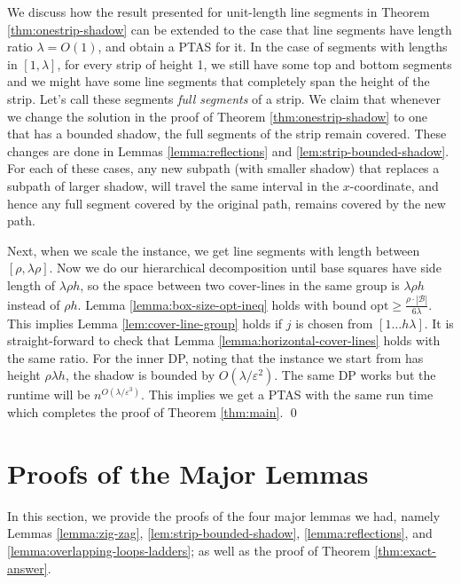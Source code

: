 \documentclass[pdflatex,sn-mathphys-num]{sn-jnl}
\theoremstyle{thmstyleone}
\newcommand{\eps}{\varepsilon}
\newcommand{\opt}{{\text{opt}}}
\begin{document}
	We discuss how the result presented for unit-length line segments in Theorem \ref{thm:onestrip-shadow} can be extended to the case that line segments have
	length ratio $\lambda=O(1)$, and obtain a PTAS for it.
	In the case of segments with lengths in $ [1, \lambda] $, for every strip of height 1, we still have some top and bottom segments and we might have some line segments
	that completely span the height of the strip. Let's call these segments {\em full segments} of a strip.
	We claim that whenever we change the solution in the proof of Theorem \ref{thm:onestrip-shadow} to one that has a bounded shadow, the full segments of the strip remain covered. These changes are done in Lemmas \ref{lemma:reflections} and \ref{lem:strip-bounded-shadow}. For each of these cases, any new subpath (with smaller shadow) that replaces a subpath of larger shadow, will travel the same interval in the $x$-coordinate, and hence any full segment covered by the original path, remains covered by the new path.
	
	Next, when we scale the instance, we get line segments with length between $[\rho,\lambda\rho]$.
	Now we do our hierarchical decomposition until base squares have side length of $\lambda\rho h$, so the space between
	two cover-lines in the same group is $\lambda \rho h$ instead of $\rho h$. 
	Lemma \ref{lemma:box-size-opt-ineq} holds with  bound $\opt\geq\frac{\rho\cdot|\mathcal B|}{6\lambda}$.
	This implies Lemma \ref{lem:cover-line-group} holds if $j$ is chosen from $[1\dots h\lambda]$.
	It is straight-forward to check that Lemma \ref{lemma:horizontal-cover-lines} holds with the same ratio.
	For the inner DP, noting that the instance we start from has height $\rho\lambda h$, the shadow is bounded
	by $O(\lambda/\eps^2)$. The same DP works but the runtime will be $n^{O(\lambda/\eps^3)}$. This implies
	we get a PTAS with the same run time which completes the proof of Theorem \ref{thm:main}. \qed

\section{Proofs of the Major Lemmas}
\label{sec:proofs}

In this section, we provide the proofs of the four major lemmas we had, namely Lemmas \ref{lemma:zig-zag}, \ref{lem:strip-bounded-shadow}, \ref{lemma:reflections}, and \ref{lemma:overlapping-loops-ladders}; as well
as the proof of Theorem \ref{thm:exact-answer}.
\end{document}
